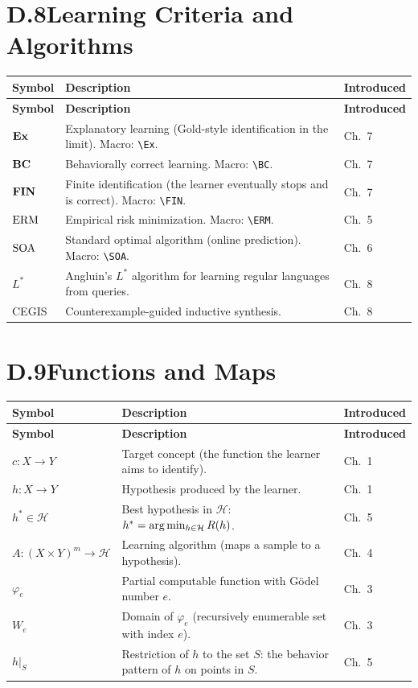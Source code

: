 \section*{D.8\quad Learning Criteria and Algorithms}
\label{sec:notation-criteria}

\begin{longtable}{lp{7.5cm}l}
\toprule
\textbf{Symbol} & \textbf{Description} & \textbf{Introduced} \\
\midrule
\endfirsthead
\toprule
\textbf{Symbol} & \textbf{Description} & \textbf{Introduced} \\
\midrule
\endhead
\bottomrule
\endlastfoot
$\mathbf{Ex}$ & Explanatory learning (Gold-style identification in the limit). Macro: \verb|\Ex|. & Ch.~7 \\
$\mathbf{BC}$ & Behaviorally correct learning. Macro: \verb|\BC|. & Ch.~7 \\
$\mathbf{FIN}$ & Finite identification (the learner eventually stops and is correct). Macro: \verb|\FIN|. & Ch.~7 \\
$\mathrm{ERM}$ & Empirical risk minimization. Macro: \verb|\ERM|. & Ch.~5 \\
$\mathrm{SOA}$ & Standard optimal algorithm (online prediction). Macro: \verb|\SOA|. & Ch.~6 \\
$L^*$ & Angluin's $L^*$ algorithm for learning regular languages from queries. & Ch.~8 \\
CEGIS & Counterexample-guided inductive synthesis. & Ch.~8 \\
\end{longtable}

\section*{D.9\quad Functions and Maps}
\label{sec:notation-functions}

\begin{longtable}{lp{7.5cm}l}
\toprule
\textbf{Symbol} & \textbf{Description} & \textbf{Introduced} \\
\midrule
\endfirsthead
\toprule
\textbf{Symbol} & \textbf{Description} & \textbf{Introduced} \\
\midrule
\endhead
\bottomrule
\endlastfoot
$c : X \to Y$ & Target concept (the function the learner aims to identify). & Ch.~1 \\
$h : X \to Y$ & Hypothesis produced by the learner. & Ch.~1 \\
$h^* \in \mathcal{H}$ & Best hypothesis in $\mathcal{H}$: $h^* = \arg\min_{h \in \mathcal{H}} R(h)$. & Ch.~5 \\
$A : (X \times Y)^m \to \mathcal{H}$ & Learning algorithm (maps a sample to a hypothesis). & Ch.~4 \\
$\varphi_e$ & Partial computable function with G\"odel number $e$. & Ch.~3 \\
$W_e$ & Domain of $\varphi_e$ (recursively enumerable set with index $e$). & Ch.~3 \\
$h|_S$ & Restriction of $h$ to the set $S$: the behavior pattern of $h$ on points in $S$. & Ch.~5 \\
\end{longtable}

